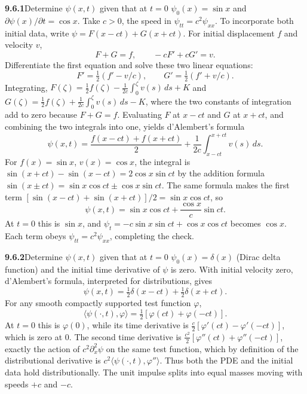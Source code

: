 \par\bigskip
\noindent\textbf{9.6.1}\quad Determine $\psi(x,t)$ given that at $t=0$
$\psi_{0}(x)=\sin x$ and $\partial\psi(x)/\partial t=\cos x$.
\solution
Take $c>0$, the speed in $\psi_{tt}=c^2\psi_{xx}$.  To incorporate
both initial data, write $\psi=F(x-ct)+G(x+ct)$.
For initial displacement $f$ and velocity $v$,
\[
F+G=f,\qquad -cF'+cG'=v.
\]
Differentiate the first equation and solve these two linear equations:
\[
F'=\tfrac12(f'-v/c),\qquad G'=\tfrac12(f'+v/c).
\]
Integrating,
$F(\zeta)=\tfrac12f(\zeta)-\tfrac1{2c}\int_0^\zeta v(s)\,ds+K$ and
$G(\zeta)=\tfrac12f(\zeta)+\tfrac1{2c}\int_0^\zeta v(s)\,ds-K$, where
the two constants of integration add to zero because $F+G=f$.
Evaluating $F$ at $x-ct$ and $G$ at $x+ct$, and combining the two
integrals into one, yields d'Alembert's formula
\[
\psi(x,t)=\frac{f(x-ct)+f(x+ct)}2
 +\frac1{2c}\int_{x-ct}^{x+ct}v(s)\,ds.
\]
For $f(x)=\sin x$, $v(x)=\cos x$, the integral is
$\sin(x+ct)-\sin(x-ct)=2\cos x\sin ct$ by the addition formula
$\sin(x\pm ct)=\sin x\cos ct\pm\cos x\sin ct$.  The same formula makes
the first term $[\sin(x-ct)+\sin(x+ct)]/2=\sin x\cos ct$, so
\[
\boxed{\psi(x,t)=\sin x\cos ct+\frac{\cos x}{c}\sin ct}.
\]
At $t=0$ this is $\sin x$, and
$\psi_t=-c\sin x\sin ct+\cos x\cos ct$ becomes $\cos x$.
Each term obeys $\psi_{tt}=c^2\psi_{xx}$, completing the check.


\par\bigskip
\noindent\textbf{9.6.2}\quad Determine $\psi(x,t)$ given that at $t=0$
$\psi_{0}(x)=\delta(x)$ (Dirac delta function) and the initial time derivative
of $\psi$ is zero.
\solution
With initial velocity zero, d'Alembert's formula, interpreted for
distributions, gives
\[
\boxed{\psi(x,t)=\tfrac12\delta(x-ct)+\tfrac12\delta(x+ct)}.
\]
For any smooth compactly supported test function $\varphi$,
\[
\langle\psi(\cdot,t),\varphi\rangle
=\tfrac12[\varphi(ct)+\varphi(-ct)].
\]
At $t=0$ this is $\varphi(0)$, while its time derivative is
$\tfrac c2[\varphi'(ct)-\varphi'(-ct)]$, which is zero at $0$.
The second time derivative is
$\tfrac{c^2}2[\varphi''(ct)+\varphi''(-ct)]$, exactly the action
of $c^2\partial_x^2\psi$ on the same test function, which by definition
of the distributional derivative is
$c^2\langle\psi(\cdot,t),\varphi''\rangle$.
Thus both the PDE and the initial data hold distributionally.
The unit impulse splits into equal masses moving with speeds $+c$
and $-c$.


